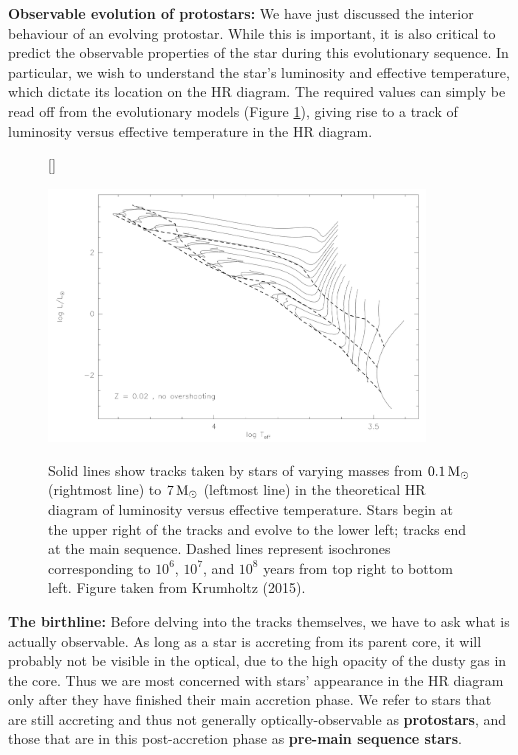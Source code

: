\documentclass[a4paper,10pt]{article}
\begin{document}
{\noindent}\textbf{Observable evolution of protostars:} We have just discussed the interior behaviour of an evolving protostar. While this is important, it is also critical to predict the observable properties of the star during this evolutionary sequence. In particular, we wish to understand the star's luminosity and effective temperature, which dictate its location on the HR diagram. The required values can simply be read off from the evolutionary models (Figure \ref{fig:HRmodels}), giving rise to a track of luminosity versus effective temperature in the HR diagram.

\begin{figure}[t]
    [\FBwidth]
    {\caption{\footnotesize{Solid lines show tracks taken by stars of varying masses from $0.1\,{\rm M_\odot}$ (rightmost line) to $7\,{\rm M_\odot}$ (leftmost line) in the theoretical HR diagram of luminosity versus effective temperature. Stars begin at the upper right of the tracks and evolve to the lower left; tracks end at the main sequence. Dashed lines represent isochrones corresponding to $10^6$, $10^7$, and $10^8$ years from top right to bottom left. Figure taken from Krumholtz (2015).}}
    \label{fig:HRmodels}}
    {\includegraphics[width=10cm]{figures/HR_models.png}}
\end{figure}

{\noindent}\textbf{The birthline:} Before delving into the tracks themselves, we have to ask what is actually observable. As long as a star is accreting from its parent core, it will probably not be visible in the optical, due to the high opacity of the dusty gas in the core. Thus we are most concerned with stars' appearance in the HR diagram only after they have finished their main accretion phase. We refer to stars that are still accreting and thus not generally optically-observable as \textbf{protostars}, and those that are in this post-accretion phase as \textbf{pre-main sequence stars}.
\end{document}

